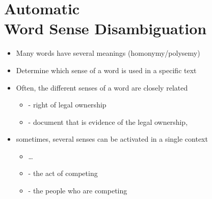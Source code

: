 \documentclass[a4paper,landscape,headrule,footrule,xetex]{foils}
\begin{document}
\section{Automatic \\ Word Sense Disambiguation}


\begin{itemize}
\item Many words have several meanings (homonymy/polysemy)
\item Determine which sense of a word is used in a specific text
\item Often, the different senses of a word are closely related
  \begin{itemize}
  \item {} -  right of legal ownership
  \item {} -  document that is evidence of the legal ownership,
  \end{itemize}
\item sometimes, several senses can be activated in a single context
  \begin{itemize}
\item \ldots {}
  \item  {} - the act of competing
  \item  {} - the people who are competing
  \end{itemize}
\end{itemize}

\end{document}
